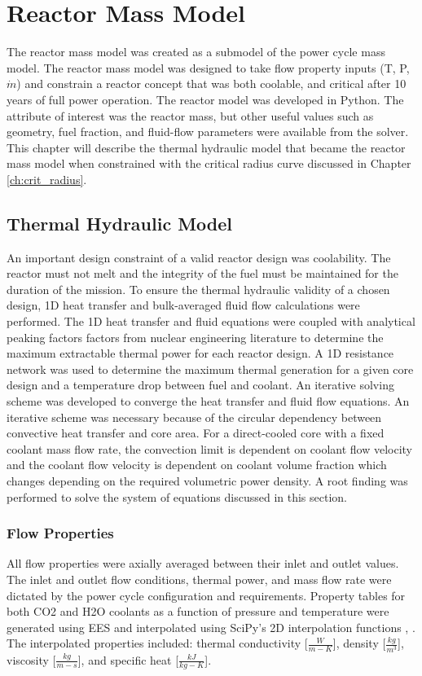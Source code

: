 \chapter{Reactor Mass Model} \label{ch:mass_model}
The reactor mass model was created as a submodel of the power cycle mass
model. The reactor mass model was designed to take flow property inputs (T, P,
$\dot{m}$) and constrain a reactor concept that was both coolable, and critical
after 10 years of full power operation. The reactor model was developed in
Python. The attribute of interest was the reactor mass, but other useful values such as geometry, fuel fraction,
and fluid-flow parameters were available from the solver. This chapter will
describe the thermal hydraulic model that became the reactor mass model when
constrained with the critical radius curve discussed in Chapter
\ref{ch:crit_radius}.

\section{Thermal Hydraulic Model}
An important design constraint of a valid reactor design was coolability. The reactor must
not melt and the integrity of the fuel must be maintained for the duration of
the mission. To ensure the thermal hydraulic validity of a chosen design, 
1D heat transfer and bulk-averaged fluid flow calculations were performed. The 1D
heat transfer and fluid equations were coupled with analytical peaking factors
factors from nuclear engineering literature to determine the maximum extractable
thermal power for each reactor design. A 1D resistance network was used to
determine the maximum thermal generation for a given core design and a temperature
drop between fuel and coolant. An iterative solving scheme was developed to
converge the heat transfer and fluid flow equations. An iterative scheme was
necessary because of the circular dependency between convective heat transfer and core
area. For a direct-cooled core with a fixed coolant mass flow rate, 
the convection limit is dependent on coolant flow velocity and the
coolant flow velocity is dependent on coolant volume fraction which changes
depending on the required volumetric power density. A root finding was performed
to solve the system of equations discussed in this section.

\subsection{Flow Properties}
All flow properties were axially averaged between their inlet and outlet values.
The inlet and outlet flow conditions, thermal power, and mass flow rate were
dictated by the power cycle configuration and requirements. Property tables for
both CO2 and H2O coolants as a function of pressure and temperature were 
generated using EES and interpolated using SciPy's 2D interpolation functions
\citep{scipy}, \citep{EES_citation}.
The interpolated properties included: thermal conductivity [$\frac{W}{m-K}$], density
[$\frac{kg}{m^3}$], viscosity [$\frac{kg}{m-s}$], and specific heat [$\frac{kJ}{kg-K}$].

